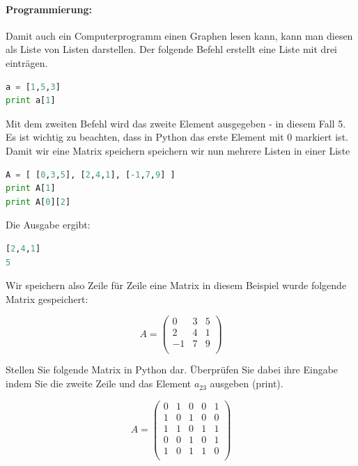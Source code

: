 \paragraph{Programmierung:}
Damit auch ein Computerprogramm einen Graphen lesen kann, kann man diesen als Liste von Listen darstellen. 
Der folgende Befehl erstellt eine Liste mit drei einträgen.
\begin{lstlisting}[language=Python,basicstyle=\small,tabsize=3]
a = [1,5,3]
print a[1]
\end{lstlisting}
Mit dem zweiten Befehl wird das zweite Element ausgegeben - in diesem Fall 5. 
Es ist wichtig zu beachten, dass in Python das erste Element mit 0 markiert ist. 
Damit wir eine Matrix speichern speichern wir nun mehrere Listen in einer Liste
\begin{lstlisting}[language=Python,basicstyle=\small,tabsize=3]
A = [ [0,3,5], [2,4,1], [-1,7,9] ]
print A[1]
print A[0][2]
\end{lstlisting}
Die Ausgabe ergibt:
\begin{lstlisting}[language=Python,basicstyle=\small,tabsize=3]
[2,4,1]
5
\end{lstlisting}
Wir speichern also Zeile für Zeile eine Matrix in diesem Beispiel wurde folgende Matrix gespeichert:

\[A =  \begin{pmatrix}
 0 & 3 & 5 \\
 2 & 4 & 1 \\
 -1& 7 & 9 \\
 \end{pmatrix}
  \]


\begin{aufg}
Stellen Sie folgende Matrix in Python dar. Überprüfen Sie dabei ihre Eingabe indem Sie die zweite Zeile und das Element $a_{23}$ ausgeben (print). 

\[ A =  \begin{pmatrix}
  0 & 1 & 0 & 0 & 1 \\
  1 & 0 & 1 & 0 & 0 \\
  1 & 1 & 0 & 1 & 1  \\
  0 & 0 & 1 & 0 & 1 \\
  1 & 0 & 1 & 1 & 0 \\
 \end{pmatrix}
\]

\end{aufg}



